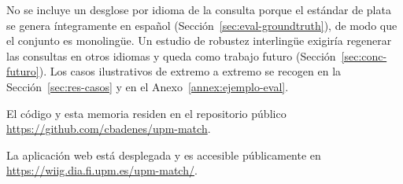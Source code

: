 No se incluye un desglose por idioma de la consulta porque el estándar de plata se genera íntegramente en español (Sección~\ref{sec:eval-groundtruth}), de modo que el conjunto es monolingüe.
Un estudio de robustez interlingüe exigiría regenerar las consultas en otros idiomas y queda como trabajo futuro (Sección~\ref{sec:conc-futuro}).
Los casos ilustrativos de extremo a extremo se recogen en la Sección~\ref{sec:res-casos} y en el Anexo~\ref{annex:ejemplo-eval}.

El código y esta memoria residen en el repositorio público \url{https://github.com/cbadenes/upm-match}.

La aplicación web está desplegada y es accesible públicamente en \url{https://wiig.dia.fi.upm.es/upm-match/}.